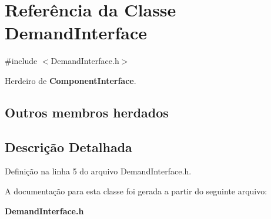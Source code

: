\section{Referência da Classe Demand\+Interface}
\label{class_demand_interface}


{\ttfamily \#include $<$Demand\+Interface.\+h$>$}



Herdeiro de {\bf Component\+Interface}.

\subsection*{Outros membros herdados}


\subsection{Descrição Detalhada}


Definição na linha 5 do arquivo Demand\+Interface.\+h.



A documentação para esta classe foi gerada a partir do seguinte arquivo\+:\begin{DoxyCompactItemize}
\item 
{\bf Demand\+Interface.\+h}\end{DoxyCompactItemize}

